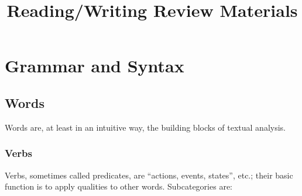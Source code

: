 \documentclass[12pt]{article}
\title{Reading/Writing Review Materials}
\author{}
\date{}
\makeatletter
\renewcommand{\maketitle}
{
\begin{flushleft}
\textbf{{\large\@title}}
\newline
\@author
\end{flushleft}
}
\makeatother
\begin{document}
\thispagestyle{empty}

\maketitle

\tableofcontents 
\newpage

\renewcommand{\labelenumi}{(\Roman{enumi})}
\renewcommand{\labelenumii}{(\Alph{enumii})}
\renewcommand{\labelenumiii}{(\roman{enumiii})}
\renewcommand{\labelenumiV}{(\alph{enumiV})}
\renewcommand{\labelenumV}{(\alph{enumV})}



\section{Grammar and Syntax}

\subsection{Words}

Words are, at least in an intuitive way, the building blocks of textual analysis.

\subsubsection{Verbs}

Verbs, sometimes called predicates, are ``actions, events, states'', etc.; their basic function is to apply qualities to other words. Subcategories are:
\end{document}

